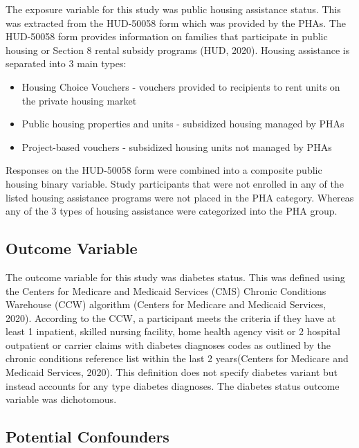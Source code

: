 \documentclass [11pt, proquest] {uwthesis}[2015/03/03]
\providecommand{\tightlist}{%
  \setlength{\itemsep}{0pt}\setlength{\parskip}{0pt}}
\begin{document}
The exposure variable for this study was public housing assistance
status. This was extracted from the HUD-50058 form which was provided by
the PHAs. The HUD-50058 form provides information on families that
participate in public housing or Section 8 rental subsidy programs (HUD,
2020). Housing assistance is separated into 3 main types:
\begin{itemize}
\tightlist
\item
  Housing Choice Vouchers - vouchers provided to recipients to rent
  units on the private housing market
\item
  Public housing properties and units - subsidized housing managed by
  PHAs
\item
  Project-based vouchers - subsidized housing units not managed by PHAs
\end{itemize}
Responses on the HUD-50058 form were combined into a composite public
housing binary variable. Study participants that were not enrolled in
any of the listed housing assistance programs were not placed in the PHA
category. Whereas any of the 3 types of housing assistance were
categorized into the PHA group.

\subsection{Outcome Variable}\label{outcome-variable}

The outcome variable for this study was diabetes status. This was
defined using the Centers for Medicare and Medicaid Services (CMS)
Chronic Conditions Warehouse (CCW) algorithm (Centers for Medicare and
Medicaid Services, 2020). According to the CCW, a participant meets the
criteria if they have at least 1 inpatient, skilled nursing facility,
home health agency visit or 2 hospital outpatient or carrier claims with
diabetes diagnoses codes as outlined by the chronic conditions reference
list within the last 2 years(Centers for Medicare and Medicaid Services,
2020). This definition does not specify diabetes variant but instead
accounts for any type diabetes diagnoses. The diabetes status outcome
variable was dichotomous.

\subsection{Potential Confounders}\label{potential-confounders}
\end{document}
